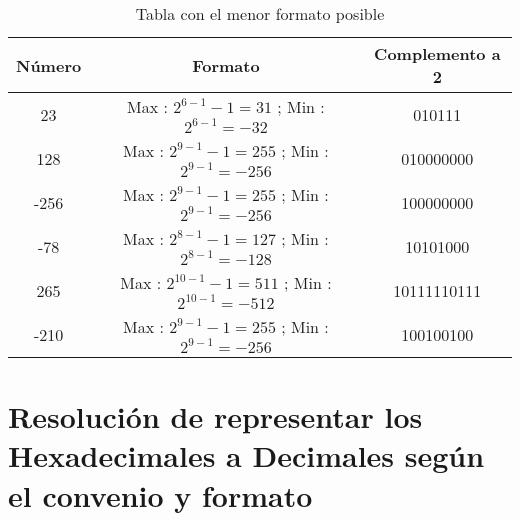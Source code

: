\documentclass[12pt]{article}
\begin{document}
\begin{table}[h!]
  \centering
  \begin{tabular}{|c|c|c|}
  \hline
  \textbf{Número} & \textbf{Formato} & \textbf{Complemento a 2}\\
  \hline
  23 &  Max : $2^{6-1} -1 = 31$ ; Min : $2^{6-1} = -32$ & 010111 \\\hline
  128 & Max : $2^{9-1} -1 = 255$ ; Min : $2^{9-1} = -256$ & 010000000 \\\hline
  -256 & Max : $2^{9-1} -1 = 255$ ; Min : $2^{9-1} = -256$ & 100000000  \\\hline
  -78 & Max : $2^{8-1} -1 = 127$ ; Min : $2^{8-1} = -128$ & 10101000  \\\hline
  265 & Max : $2^{10-1} -1 = 511$ ; Min : $2^{10-1} = -512$ & 10111110111 \\\hline
  -210 & Max : $2^{9-1} -1 = 255$ ; Min : $2^{9-1} = -256$ & 100100100 \\\hline
  \end{tabular}
  \caption{Tabla con el menor formato posible}
\end{table}

\vspace{5cm}
\section{Resolución de representar los Hexadecimales a Decimales según el convenio y formato}
\end{document}
